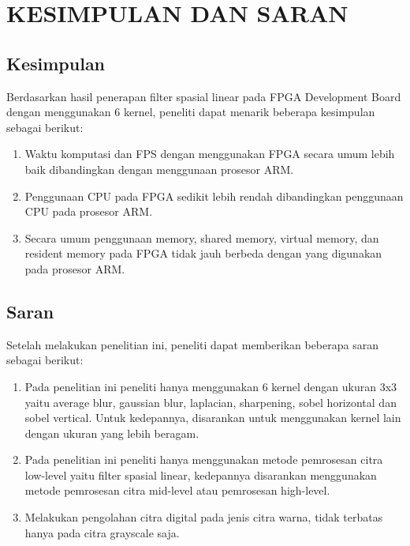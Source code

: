 
\chapter{KESIMPULAN DAN SARAN}

\section{Kesimpulan}
Berdasarkan hasil penerapan filter spasial linear pada FPGA Development Board dengan menggunakan 6 kernel, peneliti dapat menarik beberapa kesimpulan sebagai berikut:
\begin{enumerate}[topsep=0pt,itemsep=0pt,partopsep=0pt, parsep=0pt]
    \item Waktu komputasi dan FPS dengan menggunakan FPGA secara umum lebih baik dibandingkan dengan menggunaan prosesor ARM. 
    \item Penggunaan CPU pada FPGA sedikit lebih rendah dibandingkan penggunaan CPU pada prosesor ARM.
    \item Secara umum penggunaan memory, shared memory, virtual memory, dan resident memory pada FPGA tidak jauh berbeda dengan yang digunakan pada prosesor ARM.
\end{enumerate}


\section{Saran}
Setelah melakukan penelitian ini, peneliti dapat memberikan beberapa saran sebagai berikut:
\begin{enumerate}[topsep=0pt,itemsep=0pt,partopsep=0pt, parsep=0pt]
    \item Pada penelitian ini peneliti hanya menggunakan 6 kernel dengan ukuran 3x3 yaitu average blur, gaussian blur, laplacian, sharpening, sobel horizontal dan sobel vertical. Untuk kedepannya, disarankan untuk menggunakan kernel lain dengan ukuran yang lebih beragam.
    \item Pada penelitian ini peneliti hanya menggunakan metode pemrosesan citra low-level yaitu filter spasial linear, kedepannya disarankan menggunakan metode pemrosesan citra mid-level atau pemrosesan high-level.
    \item Melakukan pengolahan citra digital pada jenis citra warna, tidak terbatas hanya pada citra grayscale saja.
\end{enumerate}